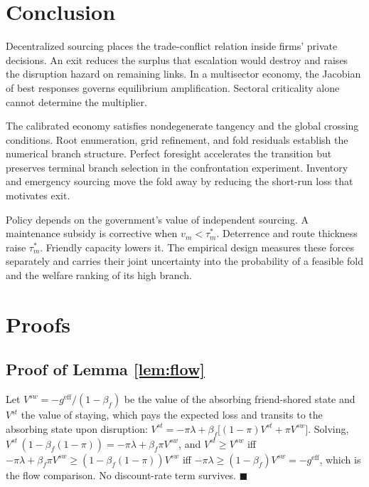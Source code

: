 \documentclass[11pt]{article}
\theoremstyle{definition}
\begin{document}
\section{Conclusion}\label{sec:conclusion}

Decentralized sourcing places the trade-conflict relation inside firms' private decisions. An exit reduces the surplus that escalation would destroy and raises the disruption hazard on remaining links. In a multisector economy, the Jacobian of best responses governs equilibrium amplification. Sectoral criticality alone cannot determine the multiplier.

The calibrated economy satisfies nondegenerate tangency and the global crossing conditions. Root enumeration, grid refinement, and fold residuals establish the numerical branch structure. Perfect foresight accelerates the transition but preserves terminal branch selection in the confrontation experiment. Inventory and emergency sourcing move the fold away by reducing the short-run loss that motivates exit.

Policy depends on the government's value of independent sourcing. A maintenance subsidy is corrective when $v_m<\tau_m^*$. Deterrence and route thickness raise $\tau_m^*$. Friendly capacity lowers it. The empirical design measures these forces separately and carries their joint uncertainty into the probability of a feasible fold and the welfare ranking of its high branch.

\clearpage
\appendix
\renewcommand{\theequation}{\thesection.\arabic{equation}}

\section{Proofs}\label{app:proofs}

\subsection{Proof of Lemma \ref{lem:flow}}
Let $V^{sw} = -g^{\mathrm{eff}}/(1-\beta_f)$ be the value of the absorbing friend-shored state and $V^{st}$ the value of staying, which pays the expected loss and transits to the absorbing state upon disruption:
$V^{st} = -\pi\lambda + \beta_f\big[(1-\pi)V^{st} + \pi V^{sw}\big]$. Solving,
$V^{st}\,(1 - \beta_f(1-\pi)) = -\pi\lambda + \beta_f \pi V^{sw}$, and
$V^{st} \ge V^{sw}$ iff $-\pi\lambda + \beta_f\pi V^{sw} \ge (1 - \beta_f(1-\pi))V^{sw}$ iff $-\pi\lambda \ge (1-\beta_f)V^{sw} = -g^{\mathrm{eff}}$, which is the flow comparison. No discount-rate term survives. $\blacksquare$
\end{document}
